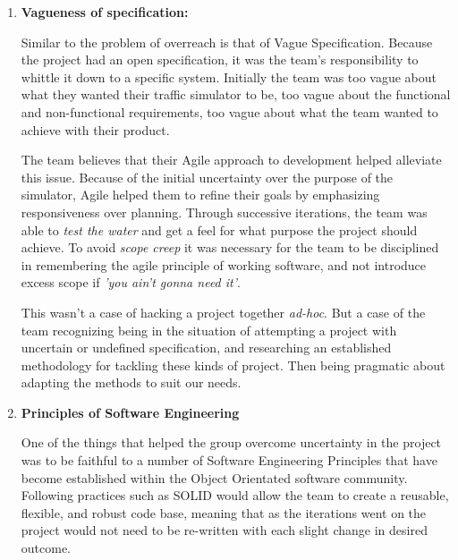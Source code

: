 \documentclass[11pt]{article}
\begin{document}
{\begin{enumerate}
	The iterative Scrum style methodology \cite{website:Scrum-Alliance} the team adopted for development worked well in allowing us to respond to our changing goal. As after our first iteration we were able to see our overreach and realign our development goals. As our iterations progressed we were able to better understand our own abilities and limitations yet still create working piece of usable software at the end of each iteration.
	
	The main learning point of overreach is to set realistic constraints, but to allow for change. So that as your team creates software they are able to take advantage of new developments and progress not only the project but also their own abilities.
		
	\item \textbf{Vagueness of specification:}
	
	Similar to the problem of overreach is that of Vague Specification. Because the project had an open specification, it was the team's responsibility to whittle it down to a specific system. Initially the team was too vague about what they wanted their traffic simulator to be, too vague about the functional and non-functional requirements, too vague about what the team wanted to achieve with their product.
	
	The team believes that their Agile approach \cite{website:Agile-Manifesto} to development helped alleviate this issue. Because of the initial uncertainty over the purpose of the simulator, Agile helped them to refine their goals by emphasizing responsiveness over planning. Through successive iterations, the team was able to \textit{test the water} and get a feel for what purpose the project should achieve. To avoid \textit{scope creep} it was necessary for the team to be disciplined in remembering the agile principle of working software, and not introduce excess scope if \textit{'you ain't gonna need it'}.
	
	This wasn't a case of hacking a project together \textit{ad-hoc}. But a case of the team recognizing being in the situation of attempting a project with uncertain or undefined specification, and researching an established methodology for tackling these kinds of project. Then being pragmatic about adapting the methods to suit our needs.
	
	\item \textbf{Principles of Software Engineering}
	
	One of the things that helped the group overcome uncertainty in the project was to be faithful to a number of Software Engineering Principles that have become established within the Object Orientated software community. Following practices such as SOLID \cite{website:Principles-of-OOD} would allow the team to create a reusable, flexible, and robust code base, meaning that as the iterations went on the project would not need to be re-written with each slight change in desired outcome.
	

\end{enumerate}}
\end{document}
